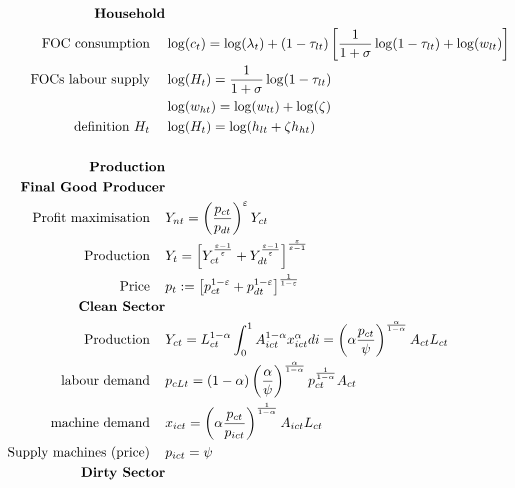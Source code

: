 \begin{align*}
\text{\textbf{Household}} & \\
\text{FOC consumption}\hspace{4mm}&  \log(c_t)= \log(\lambda_t)+ (1-\tau_{lt})\left[\frac{1}{1+\sigma}\log(1-\tau_{lt})+\log(w_{lt})\right]\\
\text{FOCs labour supply}\hspace{4mm}&  \log(H_t)=\frac{1}{1+\sigma}\log(1-\tau_{lt})\\
\ \hspace{4mm} & \log(w_{ht})=\log(w_{lt})+\log(\zeta)\\
\text{definition}\  H_t\hspace{4mm} & \log(H_t)=\log(h_{lt}+\zeta h_{ht})\\
\ 
\\
\text{\textbf{Production}}& \\
\text{\textbf{Final Good Producer}}\\
\text{Profit maximisation}\hspace{4mm} & Y_{nt}=\left(\frac{p_{ct}}{p_{dt}}\right)^\varepsilon Y_{ct}\\
\text{Production}\hspace{4mm} & Y_t=\left[Y_{ct}^{\frac{\varepsilon-1}{\varepsilon}}+Y_{dt}^{\frac{\varepsilon-1}{\varepsilon}}\right]^{\frac{\varepsilon}{\varepsilon-1}}\\
\text{Price}\hspace{4mm}& p_t:=\left[p_{ct}^{1-\varepsilon}+p_{dt}^{1-\varepsilon}\right]^{\frac{1}{1-\varepsilon}}\\
\text{\textbf{Clean Sector}}\\
\text{Production}\hspace{4mm}& Y_{ct}=L^{1-\alpha}_{ct}\int_{0}^{1}A^{1-\alpha}_{ict}x_{ict}^{\alpha}di=  \left(\alpha\frac{p_{ct}}{\psi}\right)^{\frac{\alpha}{1-\alpha}}A_{ct} L_{ct} \\ 
\text{labour demand}\hspace{4mm} & p_{cLt} =
(1-\alpha)\left(\frac{\alpha}{\psi}\right)^\frac{\alpha}{1- \alpha}p_{ct}^\frac{1}{1-\alpha}A_{ct}\\
\text{machine demand}\hspace{4mm} & x_{ict} = \left(\alpha\frac{ p_{ct}}{p_{ict}}\right)^\frac{1}{1-\alpha}A_{ict}L_{ct}\\
%
\text{Supply machines (price)}\hspace{4mm}& p_{ict}=\psi \\
\text{\textbf{Dirty Sector}}\\

\end{align*}
